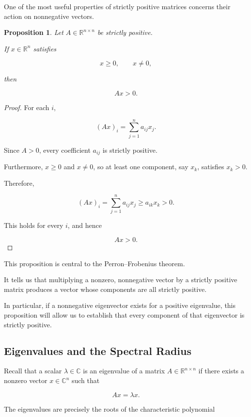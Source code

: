 \documentclass[11pt,a4paper]{article}
\newtheorem{proposition}[theorem]{Proposition}
\theoremstyle{definition}
\theoremstyle{remark}
\begin{document}
One of the most useful properties of
strictly positive matrices concerns
their action on nonnegative vectors.

\begin{proposition}
Let $A\in\mathbb{R}^{n\times n}$
be strictly positive.

If $x\in\mathbb{R}^n$ satisfies

\[
x\geq0,
\qquad
x\neq0,
\]

then

\[
Ax>0.
\]
\end{proposition}

\begin{proof}

For each $i$,

\[
(Ax)_i
=
\sum_{j=1}^{n}a_{ij}x_j.
\]

Since $A>0$, every coefficient $a_{ij}$
is strictly positive.

Furthermore, $x\geq0$ and $x\neq0$,
so at least one component, say $x_k$,
satisfies $x_k>0$.

Therefore,

\[
(Ax)_i
=
\sum_{j=1}^{n}a_{ij}x_j
\geq a_{ik}x_k>0.
\]

This holds for every $i$, and hence

\[
Ax>0.
\]

\end{proof}

This proposition is central to the
Perron--Frobenius theorem.

It tells us that multiplying a nonzero,
nonnegative vector by a strictly positive
matrix produces a vector whose
components are all strictly positive.

In particular, if a nonnegative
eigenvector exists for a positive
eigenvalue, this proposition will
allow us to establish that every
component of that eigenvector
is strictly positive.


\subsection{Eigenvalues and the Spectral Radius}

Recall that a scalar
$\lambda\in\mathbb{C}$ is an eigenvalue
of a matrix $A\in\mathbb{R}^{n\times n}$
if there exists a nonzero vector
$x\in\mathbb{C}^n$ such that

\[
Ax=\lambda x.
\]

The eigenvalues are precisely the
roots of the characteristic polynomial
\end{document}
